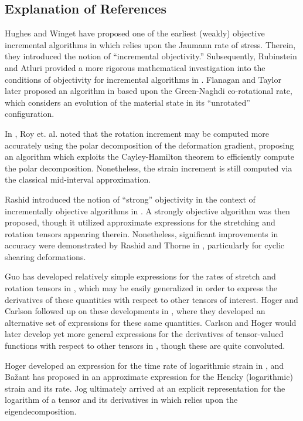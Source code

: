 \subsection{Explanation of References}

Hughes and Winget have proposed one of the earliest (weakly) objective incremental algorithms in \cite{hughes1980} which relies upon the Jaumann rate of stress. Therein, they introduced the notion of ``incremental objectivity.'' Subsequently, Rubinstein and Atluri provided a more rigorous mathematical investigation into the conditions of objectivity for incremental algorithms in \cite{rubinstein1983}. Flanagan and Taylor later proposed an algorithm in \cite{flanagan1987} based upon the Green-Naghdi co-rotational rate, which considers an evolution of the material state in its ``unrotated'' configuration.

 In \cite{roy1992}, Roy et. al. noted that the rotation increment may be computed more accurately using the polar decomposition of the deformation gradient, proposing an algorithm which exploits the Cayley-Hamilton theorem to efficiently compute the polar decomposition. Nonetheless, the strain increment is still computed via the classical mid-interval approximation.

Rashid introduced the notion of ``strong'' objectivity in the context of incrementally objective algorithms in \cite{rashid1993}. A strongly objective algorithm was then proposed, though it utilized approximate expressions for the stretching and rotation tensors appearing therein. Nonetheless, significant improvements in accuracy were demonstrated by Rashid and Thorne in \cite{rashid1996}, particularly for cyclic shearing deformations.

Guo has developed relatively simple expressions for the rates of stretch and rotation tensors in \cite{guo1984}, which may be easily generalized in order to express the derivatives of these quantities with respect to other tensors of interest. Hoger and Carlson followed up on these developments in \cite{hoger1984}, where they developed an alternative set of expressions for these same quantities. Carlson and Hoger would later develop yet more general expressions for the derivatives of tensor-valued functions with respect to other tensors in \cite{carlson1986}, though these are quite convoluted.

Hoger developed an expression for the time rate of logarithmic strain in \cite{hoger1986}, and Ba\v{z}ant has proposed in \cite{bazant1998} an approximate expression for the Hencky (logarithmic) strain and its rate. Jog ultimately arrived at an explicit representation for the logarithm of a tensor and its derivatives in \cite{jog2008} which relies upon the eigendecomposition.

